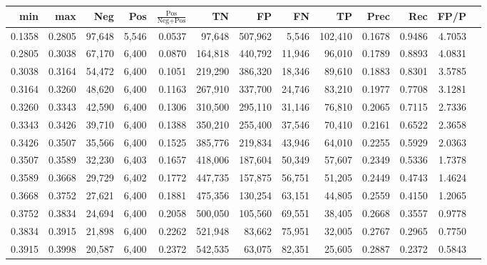 \begin{tabular}{rrrrrrrrrrrrr}
\toprule
   min &    max &    Neg &   Pos & $\frac{\text{Pos}}{\text{Neg}+\text{Pos}}$ &      TN &      FP &      FN &      TP &   Prec &    Rec &   FP/P \\
\midrule
0.1358 & 0.2805 & 97,648 & 5,546 &                                     0.0537 &  97,648 & 507,962 &   5,546 & 102,410 & 0.1678 & 0.9486 & 4.7053 \\
0.2805 & 0.3038 & 67,170 & 6,400 &                                     0.0870 & 164,818 & 440,792 &  11,946 &  96,010 & 0.1789 & 0.8893 & 4.0831 \\
0.3038 & 0.3164 & 54,472 & 6,400 &                                     0.1051 & 219,290 & 386,320 &  18,346 &  89,610 & 0.1883 & 0.8301 & 3.5785 \\
0.3164 & 0.3260 & 48,620 & 6,400 &                                     0.1163 & 267,910 & 337,700 &  24,746 &  83,210 & 0.1977 & 0.7708 & 3.1281 \\
0.3260 & 0.3343 & 42,590 & 6,400 &                                     0.1306 & 310,500 & 295,110 &  31,146 &  76,810 & 0.2065 & 0.7115 & 2.7336 \\
0.3343 & 0.3426 & 39,710 & 6,400 &                                     0.1388 & 350,210 & 255,400 &  37,546 &  70,410 & 0.2161 & 0.6522 & 2.3658 \\
0.3426 & 0.3507 & 35,566 & 6,400 &                                     0.1525 & 385,776 & 219,834 &  43,946 &  64,010 & 0.2255 & 0.5929 & 2.0363 \\
0.3507 & 0.3589 & 32,230 & 6,403 &                                     0.1657 & 418,006 & 187,604 &  50,349 &  57,607 & 0.2349 & 0.5336 & 1.7378 \\
0.3589 & 0.3668 & 29,729 & 6,402 &                                     0.1772 & 447,735 & 157,875 &  56,751 &  51,205 & 0.2449 & 0.4743 & 1.4624 \\
0.3668 & 0.3752 & 27,621 & 6,400 &                                     0.1881 & 475,356 & 130,254 &  63,151 &  44,805 & 0.2559 & 0.4150 & 1.2065 \\
0.3752 & 0.3834 & 24,694 & 6,400 &                                     0.2058 & 500,050 & 105,560 &  69,551 &  38,405 & 0.2668 & 0.3557 & 0.9778 \\
0.3834 & 0.3915 & 21,898 & 6,400 &                                     0.2262 & 521,948 &  83,662 &  75,951 &  32,005 & 0.2767 & 0.2965 & 0.7750 \\
0.3915 & 0.3998 & 20,587 & 6,400 &                                     0.2372 & 542,535 &  63,075 &  82,351 &  25,605 & 0.2887 & 0.2372 & 0.5843 \\

\end{tabular}
